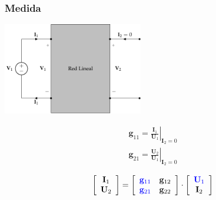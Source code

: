 \documentclass[10pt]{article}
\begin{document}
\subsubsection*{Medida}

\begin{minipage}{0.5\textwidth}
  \begin{center}
    \includegraphics[height=4cm]{../figs/parametrosG_entrada.pdf}
  \end{center}
\end{minipage}
\begin{minipage}{0.5\textwidth}
  \[
    \begin{array}{c}
      \mathbf{g}_{11} = \left.\frac{\mathbf{I}_1}{\mathbf{U}_1}\right\rvert_{\mathbf{I}_2 = 0} \\
      \mathbf{g}_{21} = \left.\frac{\mathbf{U}_2}{\mathbf{U}_1}\right\rvert_{\mathbf{I}_2 = 0}
    \end{array}
  \]



  \[
    \left[
      \begin{array}{c}
        \mathbf{I}_1\\
        \mathbf{U}_2
      \end{array}
    \right] =
    \left[
      \begin{array}{cc}
        \color{blue}{\mathbf{g}_{11}} & \mathbf{g}_{12}\\
        \color{blue}{\mathbf{g}_{21}} & \mathbf{g}_{22}
      \end{array}
    \right] \cdot
    \left[
      \begin{array}{c}
        \color{blue}{\mathbf{U}_1}\\
        \mathbf{I}_2
      \end{array}
    \right]
  \]
\end{minipage}

\vspace{1cm}
\end{document}
